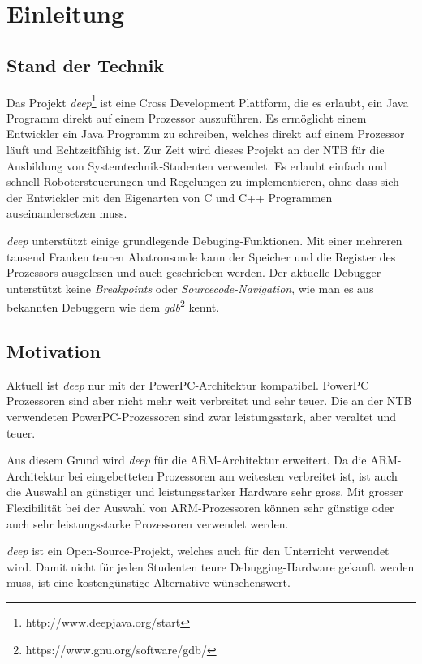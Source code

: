 \chapter{Einleitung}


\section{Stand der Technik}
Das Projekt \textit{deep}\footnote{http://www.deepjava.org/start} ist eine Cross Development Plattform, die es erlaubt, ein Java Programm direkt auf einem Prozessor auszuführen.
Es ermöglicht einem Entwickler ein Java Programm zu schreiben, welches direkt auf einem Prozessor läuft und Echtzeitfähig ist.
Zur Zeit wird dieses Projekt an der NTB für die Ausbildung von Systemtechnik-Studenten verwendet.
Es erlaubt einfach und schnell Robotersteuerungen und Regelungen zu implementieren, ohne dass sich der Entwickler mit den Eigenarten von C und C++ Programmen auseinandersetzen muss.

\textit{deep} unterstützt einige grundlegende Debuging-Funktionen.
Mit einer mehreren tausend Franken teuren Abatronsonde kann der Speicher und die Register des Prozessors ausgelesen und auch geschrieben werden.
Der aktuelle Debugger unterstützt keine \textit{Breakpoints} oder \textit{Sourcecode-Navigation}, wie man es aus bekannten Debuggern wie dem \textit{gdb}\footnote{https://www.gnu.org/software/gdb/} kennt.



\section{Motivation}
Aktuell ist \textit{deep} nur mit der PowerPC-Architektur kompatibel.
PowerPC Prozessoren sind aber nicht mehr weit verbreitet und sehr teuer.
Die an der NTB verwendeten PowerPC-Prozessoren sind zwar leistungsstark, aber veraltet und teuer.

Aus diesem Grund wird \textit{deep} für die ARM-Architektur erweitert.
Da die ARM-Architektur bei eingebetteten Prozessoren am weitesten verbreitet ist, ist auch die Auswahl an günstiger und leistungsstarker Hardware sehr gross.
Mit grosser Flexibilität bei der Auswahl von ARM-Prozessoren können sehr günstige oder auch sehr leistungsstarke Prozessoren verwendet werden.

\textit{deep} ist ein Open-Source-Projekt, welches auch für den Unterricht verwendet wird.
Damit nicht für jeden Studenten teure Debugging-Hardware gekauft werden muss, ist eine kostengünstige Alternative wünschenswert.

